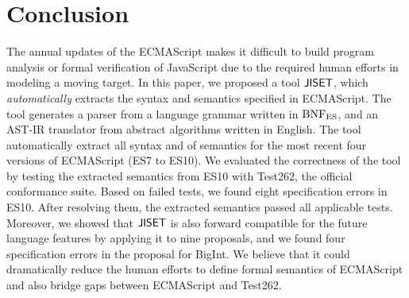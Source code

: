 \section{Conclusion}\label{sec:conclude}

The annual updates of the ECMAScript makes it difficult to build program
analysis or formal verification of JavaScript due to the required human efforts
in modeling a moving target.  In this paper, we proposed a tool \( \text{\sf JISET} \),
which \textit{automatically} extracts the syntax and semantics specified in
ECMAScript.  The tool generates a parser from a language grammar written in \(
\text{BNF}_{\text{ES}} \), and an AST-IR translator from abstract algorithms written in
English.  The tool automatically extract all syntax and  of
semantics for the most recent four versions of ECMAScript (ES7 to ES10).  We
evaluated the correctness of the tool by testing the extracted semantics from
ES10 with Test262, the official conformance suite.  Based on 
failed tests, we found eight specification errors in ES10. After resolving
them, the extracted semantics passed all  applicable tests.
Moreover, we showed that \( \text{\sf JISET} \) is also forward compatible for the future
language features by applying it to nine proposals, and we found four
specification errors in the proposal for BigInt.  We believe that it could
dramatically reduce the human efforts to define formal semantics of ECMAScript
and also bridge gaps between ECMAScript and Test262.
